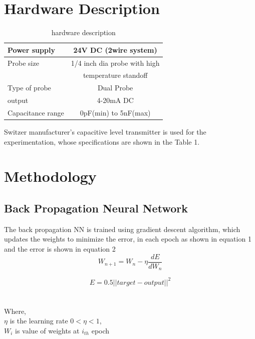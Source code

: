 \documentclass[conference]{IEEEtran}
\begin{document}
\section{Hardware Description}
\begin{table}[htdp]
\begin{center}
  \begin{tabular}{ | l | c |}
    \hline
    Power supply   & 24V DC (2wire system) \\ \hline
    Probe size     & 1/4 inch dia probe with high\\ 
                   & temperature standoff \\ \hline
    Type of probe  & Dual Probe \\ \hline
    output         & 4-20mA DC \\ \hline
    Capacitance range  & 0pF(min) to 5nF(max) \\ \hline
  \end{tabular}
\end{center}
\caption{hardware description\label{tab:a}}
\end{table}
Switzer manufacturer’s capacitive level transmitter is used for the experimentation, whose specifications are shown in the Table 1.

\section{Methodology}
\subsection{Back Propagation Neural Network}
The back propagation NN is trained using gradient descent algorithm, which updates the weights to minimize the error, in each epoch as shown in equation 1 and the error is shown in equation 2\\
\begin{equation} \label{eq:1}
W_{n+1} = W_n-\eta \frac{dE}{dW_n}
\end{equation}

\begin{equation} \label{eq:2}
E = 0.5 ||target-output||^2
\end{equation}\\
\\
Where,\\
$\eta$ is the learning rate $0<\eta<1$, \\
$W_i$ is value of weights at $i_{th}$ epoch
\end{document}
